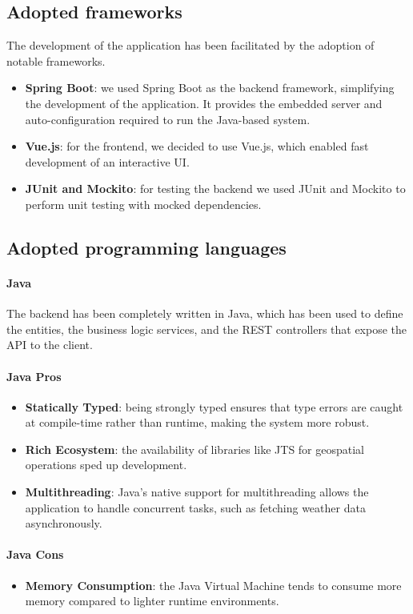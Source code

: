 \subsection{Adopted frameworks}
The development of the application has been facilitated by the adoption of notable frameworks.
\begin{itemize}
    \item \textbf{Spring Boot}: we used Spring Boot as the backend framework, simplifying the development of the application. It provides the embedded server and auto-configuration required to run the Java-based system.
    \item \textbf{Vue.js}: for the frontend, we decided to use Vue.js, which enabled fast development of an interactive UI.
    \item \textbf{JUnit and Mockito}: for testing the backend we used JUnit and Mockito to perform unit testing with mocked dependencies.
\end{itemize}

\subsection{Adopted programming languages}

\paragraph{Java}
The backend has been completely written in Java, which has been used to define the entities, the business logic services, and the REST controllers that expose the API to the client.

\paragraph{Java Pros}
\begin{itemize}
    \item \textbf{Statically Typed}: being strongly typed ensures that type errors are caught at compile-time rather than runtime, making the system more robust.
    \item \textbf{Rich Ecosystem}: the availability of libraries like JTS for geospatial operations sped up development.
    \item \textbf{Multithreading}: Java's native support for multithreading allows the application to handle concurrent tasks, such as fetching weather data asynchronously.
\end{itemize}

\paragraph{Java Cons}
\begin{itemize}
    \item \textbf{Memory Consumption}: the Java Virtual Machine tends to consume more memory compared to lighter runtime environments.
\end{itemize}

